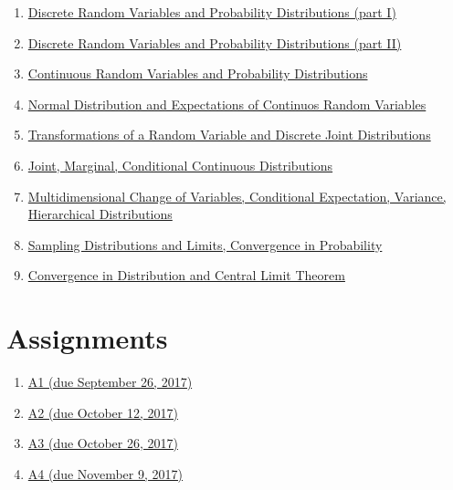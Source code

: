 \documentclass[]{book}
\providecommand{\tightlist}{%
  \setlength{\itemsep}{0pt}\setlength{\parskip}{0pt}}
\theoremstyle{definition}
\theoremstyle{definition}
\theoremstyle{definition}
\theoremstyle{remark}
\begin{document}
\begin{enumerate}
\def\labelenumi{\arabic{enumi}.}
\tightlist
\item
  \href{https://github.com/sahirbhatnagar/MATH697/blob/master/images/week3.pdf}{Discrete
  Random Variables and Probability Distributions (part I)}
\item
  \href{https://github.com/sahirbhatnagar/MATH697/blob/master/images/week4.pdf}{Discrete
  Random Variables and Probability Distributions (part II)}
\item
  \href{https://github.com/sahirbhatnagar/MATH697/blob/master/images/week5.pdf}{Continuous
  Random Variables and Probability Distributions}
\item
  \href{https://github.com/sahirbhatnagar/MATH697/blob/master/images/week6.pdf}{Normal
  Distribution and Expectations of Continuos Random Variables}
\item
  \href{https://github.com/sahirbhatnagar/MATH697/blob/master/images/week7.pdf}{Transformations
  of a Random Variable and Discrete Joint Distributions}
\item
  \href{https://github.com/sahirbhatnagar/MATH697/blob/master/images/week8.pdf}{Joint,
  Marginal, Conditional Continuous Distributions}
\item
  \href{https://github.com/sahirbhatnagar/MATH697/blob/master/images/week9.pdf}{Multidimensional
  Change of Variables, Conditional Expectation, Variance, Hierarchical
  Distributions}
\item
  \href{https://github.com/sahirbhatnagar/MATH697/blob/master/images/week10.pdf}{Sampling
  Distributions and Limits, Convergence in Probability}
\item
  \href{https://github.com/sahirbhatnagar/MATH697/blob/master/images/week11.pdf}{Convergence
  in Distribution and Central Limit Theorem}
\end{enumerate}

\chapter*{Assignments}\label{assignments}

\begin{enumerate}
\def\labelenumi{\arabic{enumi}.}
\tightlist
\item
  \href{https://github.com/sahirbhatnagar/MATH697/blob/master/images/HW-1-F2017.pdf}{A1
  (due September 26, 2017)}
\item
  \href{https://github.com/sahirbhatnagar/MATH697/blob/master/images/HW-2-F2017.pdf}{A2
  (due October 12, 2017)}
\item
  \href{https://github.com/sahirbhatnagar/MATH697/blob/master/images/HW-3-F2017.pdf}{A3
  (due October 26, 2017)}
\item
  \href{https://github.com/sahirbhatnagar/MATH697/blob/master/images/HW-4-F2017.pdf}{A4
  (due November 9, 2017)}
\end{enumerate}
\end{document}
